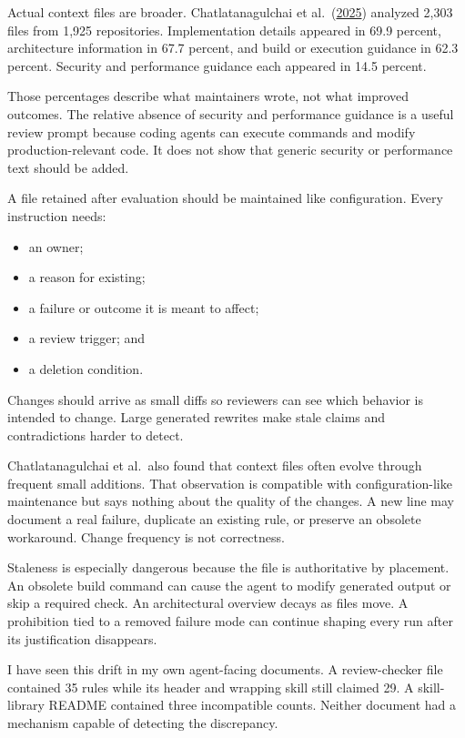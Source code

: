 Actual context files are broader. Chatlatanagulchai et al.~(\href{https://arxiv.org/abs/2511.12884}{2025}) analyzed 2,303 files from 1,925 repositories. Implementation details appeared in 69.9 percent, architecture information in 67.7 percent, and build or execution guidance in 62.3 percent. Security and performance guidance each appeared in 14.5 percent.

Those percentages describe what maintainers wrote, not what improved outcomes. The relative absence of security and performance guidance is a useful review prompt because coding agents can execute commands and modify production-relevant code. It does not show that generic security or performance text should be added.

A file retained after evaluation should be maintained like configuration. Every instruction needs:

\begin{itemize}
\tightlist
\item
  an owner;
\item
  a reason for existing;
\item
  a failure or outcome it is meant to affect;
\item
  a review trigger; and
\item
  a deletion condition.
\end{itemize}

Changes should arrive as small diffs so reviewers can see which behavior is intended to change. Large generated rewrites make stale claims and contradictions harder to detect.

Chatlatanagulchai et al.~also found that context files often evolve through frequent small additions. That observation is compatible with configuration-like maintenance but says nothing about the quality of the changes. A new line may document a real failure, duplicate an existing rule, or preserve an obsolete workaround. Change frequency is not correctness.

Staleness is especially dangerous because the file is authoritative by placement. An obsolete build command can cause the agent to modify generated output or skip a required check. An architectural overview decays as files move. A prohibition tied to a removed failure mode can continue shaping every run after its justification disappears.

I have seen this drift in my own agent-facing documents. A review-checker file contained 35 rules while its header and wrapping skill still claimed 29. A skill-library README contained three incompatible counts. Neither document had a mechanism capable of detecting the discrepancy.


